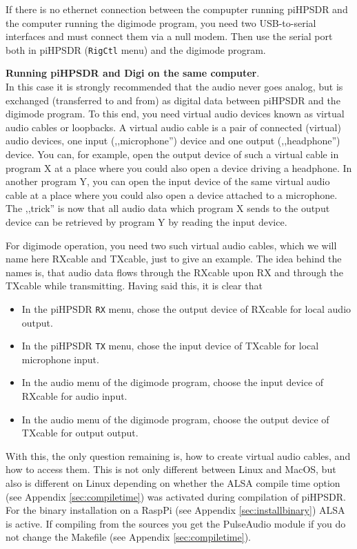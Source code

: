 \documentclass[12pt]{book}
\def\bltt#1{\texttt{\color{blue}#1}}
\begin{document}
If there is no ethernet connection between the compupter running piHPSDR and the computer
running the digimode program, you need two USB-to-serial interfaces and must connect them
via a null modem. Then use the serial port both in piHPSDR (\bltt{RigCtl} menu) and the
digimode program.

\textbf{\color{red}Running piHPSDR and Digi on the same computer}. \\
In this case it is strongly recommended that the audio never goes analog, but is 
exchanged (transferred to and from)
as digital data between piHPSDR and the digimode program. To this end, you need 
virtual audio devices known as {\color{red} virtual audio cables} or {\color{red}
loopbacks}. A virtual audio cable is a pair of connected (virtual) audio devices,
one input (,,microphone'') device and one output (,,headphone'') device. You can,
for example, open the output device of such a virtual cable in program X at a place
where you could also open a device driving a headphone. In another program Y, you can
open the input device of the same virtual audio cable at a place where you could also
open a device attached to a microphone. The ,,trick'' is now that all audio data which
program X sends to the output device can be retrieved by program Y by reading the input device.



For digimode operation, you need two such virtual audio cables, which we will name here
RXcable and TXcable, just to give an example. The idea behind the names is, that audio data
flows through the RXcable upon RX and through the TXcable while transmitting. Having said this,
it is clear that

\begin{itemize}
\item{In the piHPSDR \bltt{RX} menu, chose the output device of RXcable for local audio output.}
\item{In the piHPSDR \bltt{TX} menu, chose the input device of TXcable for local microphone input.}
\item{In the audio menu of the digimode program, choose the input device of RXcable for audio input.}
\item{In the audio menu of the digimode program, choose the output device of TXcable for output output.}
\end{itemize}

With this, the only question remaining is, how to create virtual audio cables, and how to access them.
This is not only different between Linux and MacOS, but also is different on Linux depending on
whether the ALSA compile time option (see Appendix \ref{sec:compiletime}) was activated during 
compilation of piHPSDR. For the binary installation on a RaspPi (see Appendix \ref{sec:installbinary})
ALSA is active. If compiling from the sources you get the PulseAudio module if you
do not change the Makefile (see Appendix \ref{sec:compiletime}).
\end{document}
